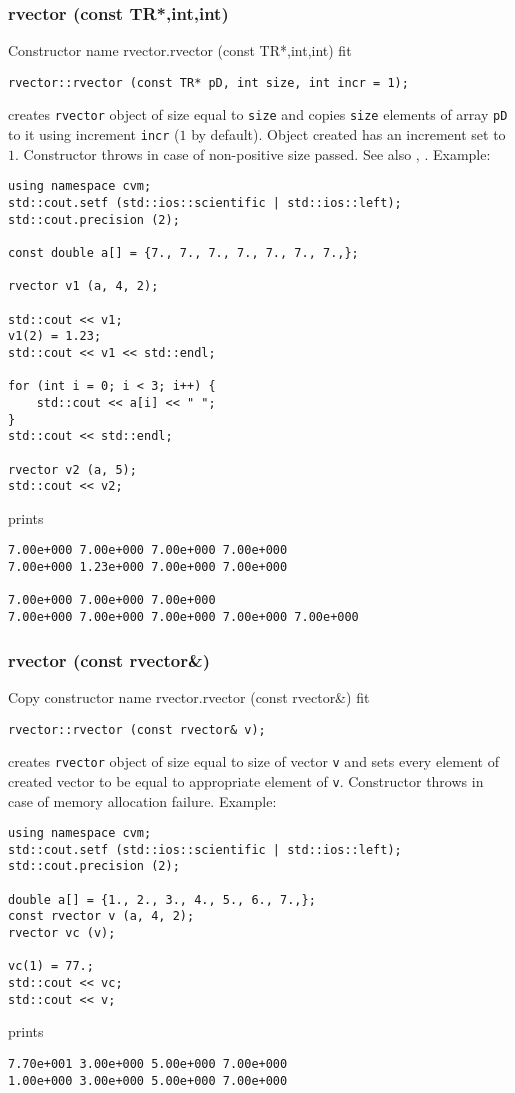 \subsubsection{rvector (const TR*,int,int)}
Constructor%
\pdfdest name {rvector.rvector (const TR*,int,int)} fit
\begin{verbatim}
rvector::rvector (const TR* pD, int size, int incr = 1);
\end{verbatim}
creates \verb"rvector" object of size equal to \verb"size"
and copies \verb"size" elements of
 array \verb"pD" to it using increment \verb"incr" ($1$ by default).
Object created has an increment set to $1$.
Constructor throws  
in case of non-positive size passed.
See also , .
Example:
\begin{Verbatim}
using namespace cvm;
std::cout.setf (std::ios::scientific | std::ios::left); 
std::cout.precision (2);

const double a[] = {7., 7., 7., 7., 7., 7., 7.,};

rvector v1 (a, 4, 2);

std::cout << v1;
v1(2) = 1.23;
std::cout << v1 << std::endl;

for (int i = 0; i < 3; i++) {
    std::cout << a[i] << " ";
}
std::cout << std::endl;

rvector v2 (a, 5);
std::cout << v2;
\end{Verbatim}
prints
\begin{Verbatim}
7.00e+000 7.00e+000 7.00e+000 7.00e+000
7.00e+000 1.23e+000 7.00e+000 7.00e+000

7.00e+000 7.00e+000 7.00e+000
7.00e+000 7.00e+000 7.00e+000 7.00e+000 7.00e+000
\end{Verbatim}
\newpage




\subsubsection{rvector (const rvector\&)}
Copy constructor%
\pdfdest name {rvector.rvector (const rvector&)} fit
\begin{verbatim}
rvector::rvector (const rvector& v);
\end{verbatim}         
creates \verb"rvector" object of size equal to size of
vector \verb"v" and sets every element of created vector to be equal to
appropriate element of \verb"v".
Constructor throws  
in case of memory allocation failure.
Example:
\begin{Verbatim}
using namespace cvm;
std::cout.setf (std::ios::scientific | std::ios::left); 
std::cout.precision (2);

double a[] = {1., 2., 3., 4., 5., 6., 7.,};
const rvector v (a, 4, 2);
rvector vc (v);

vc(1) = 77.;
std::cout << vc;
std::cout << v;
\end{Verbatim}
prints
\begin{Verbatim}
7.70e+001 3.00e+000 5.00e+000 7.00e+000
1.00e+000 3.00e+000 5.00e+000 7.00e+000
\end{Verbatim}
\newpage



